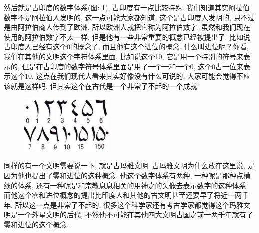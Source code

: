 然后就是古印度的数字体系(图: \ref{fig:img2_8}). 古印度有一点比较特殊. 我们知道其实阿拉伯数字不是阿拉伯人发明的, 这一点可能大家都知道, 这个是古印度人发明的, 只不过是由阿拉伯商人传到了欧洲, 所以欧洲人就把它称为阿拉伯数字. 虽然和我们现在使用的阿拉伯数字不太一样, 但是他有一些非常重要的概念已经被提出了. 比如说古印度人已经有这个0的概念了, 而且他有这个进位的概念. 什么叫进位呢？你看, 我们在其他的文明这个字符体系里面, 比如说这个10, 它是用一个特别的符号来表示的, 但是在古印度的数字符号体系里面是用了一个一和一个0, 这个0占一位来表示这个10. 这点在我们现代人看来其实好像没有什么可说的, 大家可能会觉得不应该就是这样吗. 但其实这个在古代是一个非常了不起的一个成就. 

\begin{figure}[ht]
  \centering\includegraphics[width=0.4\textwidth]{asset/02cf4930-6fd5-40ab-b755-155d4bcf1fa1.png}
  \caption{}
  \label{fig:img2_8}
\end{figure}

同样的有一个文明需要说一下, 就是古玛雅文明. 古玛雅文明为什么放在这里说, 是因为他也提出了零和进位的这种概念. 他这个数字体系有两种, 一种呢是那种点横线的体系, 还有一种呢是和宗教息息相关的用神之的头像去表示数字的这种体系. 而他这个零和进位概念的提出比印度人和其他的古文明甚至还要早了将近一两千年. 所以这一点是非常了不起的, 很多这个科学家还有考古学家都觉得这个玛雅文明是一个外星文明的后代, 不然他不可能在其他四大文明古国之前一两千年就有了零和进位的这个概念. 

